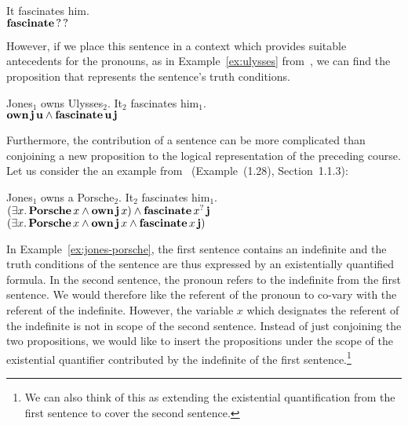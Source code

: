 \begin{exe}
  \ex It fascinates him. \label{ex:no-antecedent} \\
  $\textbf{fascinate}\,?\,?$
\end{exe}

However, if we place this sentence in a context which provides suitable
antecedents for the pronouns, as in Example~\ref{ex:ulysses}
from~\cite{kamp1993discourse}, we can find the proposition that represents
the sentence's truth conditions.

\begin{exe}
  \ex Jones$_1$ owns Ulysses$_2$. It$_2$ fascinates him$_1$. \label{ex:ulysses} \\
  $\textbf{own}\,\textbf{j}\,\textbf{u} \land \textbf{fascinate}\,\textbf{u}\,\textbf{j}$
\end{exe}

Furthermore, the contribution of a sentence can be more complicated than
conjoining a new proposition to the logical representation of the preceding
course. Let us consider the an example from~\cite{kamp1993discourse}
(Example~(1.28), Section~1.1.3):

\begin{exe}
  \ex Jones$_1$ owns a Porsche$_2$. It$_2$ fascinates him$_1$. \label{ex:jones-porsche} \\
  $(\exists x.\, \textbf{Porsche}\,x \land \textbf{own}\,\textbf{j}\,x)
  \land \textbf{fascinate}\,x^?\,\textbf{j}$ \\
  $(\exists x.\, \textbf{Porsche}\,x \land \textbf{own}\,\textbf{j}\,x
  \land \textbf{fascinate}\,x\,\textbf{j})$ \\
\end{exe}

In Example~\ref{ex:jones-porsche}, the first sentence contains an
indefinite and the truth conditions of the sentence are thus expressed by
an existentially quantified formula. In the second sentence, the pronoun
refers to the indefinite from the first sentence. We would therefore like
the referent of the pronoun to co-vary with the referent of the
indefinite. However, the variable $x$ which designates the referent of the
indefinite is not in scope of the second sentence. Instead of just
conjoining the two propositions, we would like to insert the propositions
under the scope of the existential quantifier contributed by the indefinite
of the first sentence.\footnote{We can also think of this as extending the
  existential quantification from the first sentence to cover the second
  sentence.}

